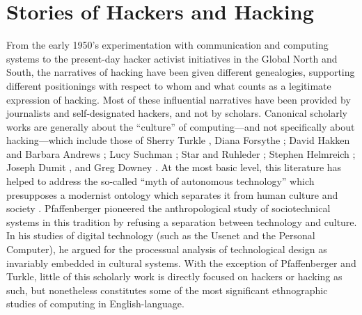 \documentclass[10pt,letter,oneside]{scrartcl}
\begin{document}
\section*{Stories of Hackers and Hacking}

From the early 1950's experimentation with communication and computing systems
to the present-day hacker activist initiatives in the Global North and South,
the narratives of hacking have been given different genealogies, supporting
different positionings with respect to whom and what counts as a legitimate
expression of hacking.  Most of these influential narratives have been provided
by journalists and self-designated hackers, and not by scholars.  Canonical
scholarly works are generally about the ``culture'' of computing---and not
specifically about hacking---which include those of Sherry Turkle
\cite*{turkle_life_1995,turkle_second_1984}, Diana Forsythe
\cite*{forsythe_studying_2001}; David Hakken and Barbara Andrews
\cite*{hakken_computing_1993}; Lucy Suchman \cite*{suchman_plans_1987}; Star and
Ruhleder \cite*{star_infrastructure_1996}; Stephen Helmreich
\cite*{helmreich_silicon_1998}; Joseph Dumit \cite*{dumit_picturing_2004}, and
Greg Downey \cite*{downey_machine_1998}. At the most basic level, this literature 
has helped to address the so-called ``myth of autonomous technology'' which 
presupposes a modernist ontology which separates it from human culture and 
society \parencite{latour_wehave_2008,winner_auto_1978,}.  Pfaffenberger
\cite*{pfaffenberger_social_1992} pioneered the anthropological study of
sociotechnical systems in this tradition by refusing a separation between 
technology and culture. In his studies of digital technology (such as the Usenet
and the Personal Computer), he argued for the processual analysis of technological
design as invariably embedded in cultural systems. With the exception of
Pfaffenberger and Turkle, little of this scholarly work is directly focused on 
hackers or hacking as such, but nonetheless constitutes some of the most significant
ethnographic studies of computing in English-language.
\end{document}
